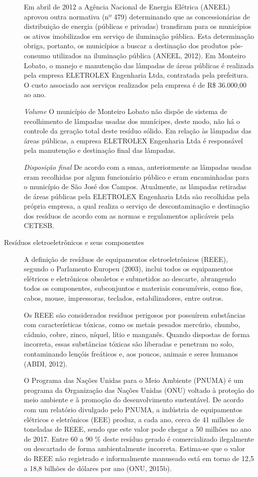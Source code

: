 \begin{description}
	Em abril de 2012 a Agência Nacional de Energia Elétrica (ANEEL) aprovou outra normativa (nº 479) determinando que as concessionárias de distribuição de energia (públicas e privadas) transfiram para os municípios os ativos imobilizados em serviço de iluminação pública. Esta determinação obriga, portanto, os municípios a buscar a destinação dos produtos pós-consumo utilizados na iluminação pública (ANEEL, 2012).
	Em Monteiro Lobato, o manejo e manutenção das lâmpadas de áreas públicas é realizada pela empresa ELETROLEX Engenharia Ltda, contratada pela prefeitura. O custo associado aos serviços realizados pela empresa é de R\$ 36.000,00 ao ano.
	
		\subitem \textit{Volume}
		O município de Monteiro Lobato não dispõe de sistema de recolhimento de lâmpadas usadas dos munícipes, deste modo, não há o controle da geração total deste resíduo sólido.
		Em relação às lâmpadas das áreas públicas, a empresa ELETROLEX Engenharia Ltda é responsável pela manutenção e destinação final das lâmpadas.
	
		\subitem \textit{Disposição final}
		De acordo com a \gls{smaa}, anteriormente as lâmpadas usadas eram recolhidas por algum funcionário público e eram encaminhadas para o município de São José dos Campos.
		Atualmente, as lâmpadas retiradas de áreas públicas pela ELETROLEX Engenharia Ltda são recolhidas pela própria empresa, a qual realiza o serviço de descontaminação e destinação dos resíduos de acordo com as normas e regulamentos aplicáveis pela CETESB.
	
	
	\item[Resíduos eletroeletrônicos e seus componentes] A definição de resíduos de equipamentos eletroeletrônicos (REEE), segundo o Parlamento Europeu (2003), inclui todos os equipamentos elétricos e eletrônicos obsoletos e submetidos ao descarte, abrangendo todos os componentes, subconjuntos e materiais consumíveis, como fios, cabos, mouse, impressoras, teclados, estabilizadores, entre outros.
	
	Os REEE são considerados resíduos perigosos por possuírem substâncias com características tóxicas, como os metais pesados mercúrio, chumbo, cádmio, cobre, zinco, níquel, lítio e manganês. Quando dispostas de forma incorreta, essas substâncias tóxicas são liberadas e penetram no solo, contaminando lençóis freáticos e, aos poucos, animais e seres humanos (ABDI, 2012).
	
	O Programa das Nações Unidas para o Meio Ambiente (PNUMA) é um programa da Organização das Nações Unidas (ONU) voltado à proteção do meio ambiente e à promoção do desenvolvimento sustentável. De acordo com um relatório divulgado pelo PNUMA, a indústria de equipamentos elétricos e eletrônicos (EEE) produz, a cada ano, cerca de 41 milhões de toneladas de REEE, sendo que este valor pode chegar a 50 milhões no ano de 2017. Entre 60 a 90 \% deste resíduo gerado é comercializado ilegalmente ou descartado de forma ambientalmente incorreta. Estima-se que o valor do REEE não registrado e informalmente manuseado está em torno de 12,5 a 18,8 bilhões de dólares por ano (ONU, 2015b).
	

\end{description}
